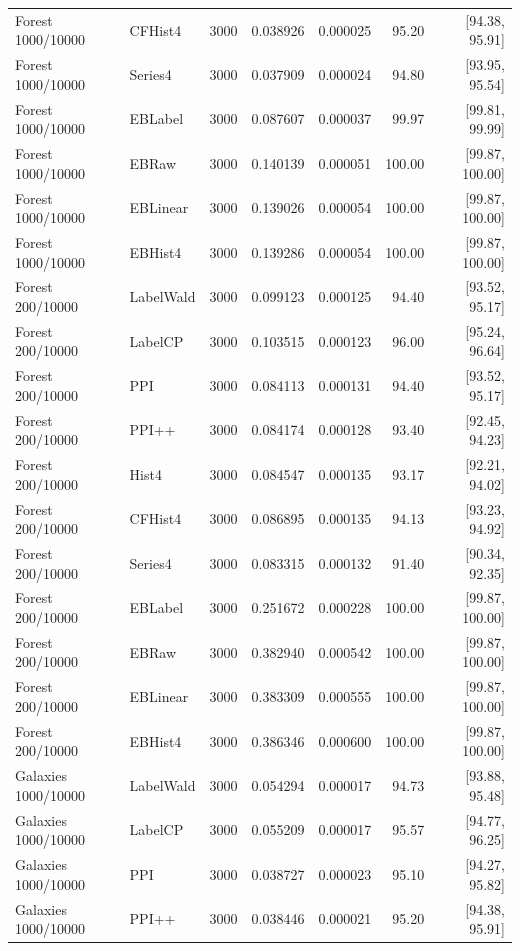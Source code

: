 \begin{longtable}{llrrrrr}
Forest 1000/10000 & CFHist4 & 3000 & 0.038926 & 0.000025 & 95.20 & [94.38, 95.91]\\
Forest 1000/10000 & Series4 & 3000 & 0.037909 & 0.000024 & 94.80 & [93.95, 95.54]\\
Forest 1000/10000 & EBLabel & 3000 & 0.087607 & 0.000037 & 99.97 & [99.81, 99.99]\\
Forest 1000/10000 & EBRaw & 3000 & 0.140139 & 0.000051 & 100.00 & [99.87, 100.00]\\
Forest 1000/10000 & EBLinear & 3000 & 0.139026 & 0.000054 & 100.00 & [99.87, 100.00]\\
Forest 1000/10000 & EBHist4 & 3000 & 0.139286 & 0.000054 & 100.00 & [99.87, 100.00]\\
Forest 200/10000 & LabelWald & 3000 & 0.099123 & 0.000125 & 94.40 & [93.52, 95.17]\\
Forest 200/10000 & LabelCP & 3000 & 0.103515 & 0.000123 & 96.00 & [95.24, 96.64]\\
Forest 200/10000 & PPI & 3000 & 0.084113 & 0.000131 & 94.40 & [93.52, 95.17]\\
Forest 200/10000 & PPI++ & 3000 & 0.084174 & 0.000128 & 93.40 & [92.45, 94.23]\\
Forest 200/10000 & Hist4 & 3000 & 0.084547 & 0.000135 & 93.17 & [92.21, 94.02]\\
Forest 200/10000 & CFHist4 & 3000 & 0.086895 & 0.000135 & 94.13 & [93.23, 94.92]\\
Forest 200/10000 & Series4 & 3000 & 0.083315 & 0.000132 & 91.40 & [90.34, 92.35]\\
Forest 200/10000 & EBLabel & 3000 & 0.251672 & 0.000228 & 100.00 & [99.87, 100.00]\\
Forest 200/10000 & EBRaw & 3000 & 0.382940 & 0.000542 & 100.00 & [99.87, 100.00]\\
Forest 200/10000 & EBLinear & 3000 & 0.383309 & 0.000555 & 100.00 & [99.87, 100.00]\\
Forest 200/10000 & EBHist4 & 3000 & 0.386346 & 0.000600 & 100.00 & [99.87, 100.00]\\
Galaxies 1000/10000 & LabelWald & 3000 & 0.054294 & 0.000017 & 94.73 & [93.88, 95.48]\\
Galaxies 1000/10000 & LabelCP & 3000 & 0.055209 & 0.000017 & 95.57 & [94.77, 96.25]\\
Galaxies 1000/10000 & PPI & 3000 & 0.038727 & 0.000023 & 95.10 & [94.27, 95.82]\\
Galaxies 1000/10000 & PPI++ & 3000 & 0.038446 & 0.000021 & 95.20 & [94.38, 95.91]\\

\end{longtable}
